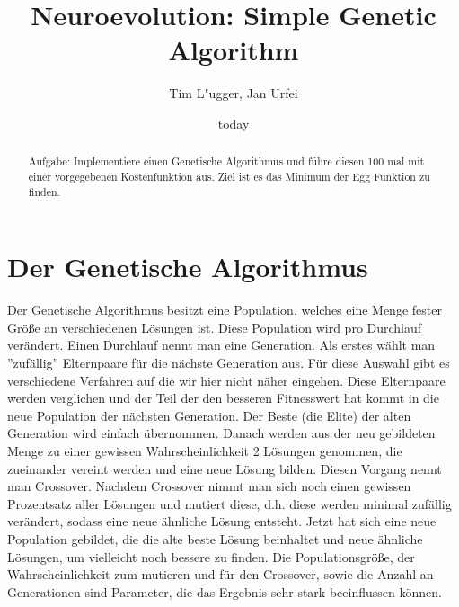\documentclass{hbrs-ecta-report}
\begin{document}

\title{Neuroevolution: Simple Genetic Algorithm}
\subtitle{}

\author{
\alignauthor
Tim L"ugger, Jan Urfei
}

\date{today}
\maketitle
\begin{abstract}
Aufgabe: Implementiere einen Genetische Algorithmus und führe diesen 100 mal mit einer vorgegebenen Kostenfunktion aus. Ziel ist es das Minimum der Egg Funktion zu finden.
\end{abstract}

\section{Der Genetische Algorithmus}
Der Genetische Algorithmus besitzt eine Population, welches eine Menge fester Größe an verschiedenen Lösungen ist. Diese Population wird pro Durchlauf verändert. Einen Durchlauf nennt man eine Generation. 
\newline \newline
Als erstes wählt man ''zufällig'' Elternpaare für die nächste Generation aus. Für diese Auswahl gibt es verschiedene Verfahren auf die wir hier nicht näher eingehen. Diese Elternpaare werden verglichen und der Teil der den besseren Fitnesswert hat kommt in die neue Population der nächsten Generation. Der Beste (die Elite) der alten Generation wird einfach übernommen.
\newline \newline
Danach werden aus der neu gebildeten Menge zu einer gewissen Wahrscheinlichkeit  2 Lösungen genommen, die zueinander vereint werden und eine neue Lösung bilden. Diesen Vorgang nennt man Crossover.
\newline \newline
Nachdem Crossover nimmt man sich noch einen gewissen Prozentsatz aller Lösungen und mutiert diese, d.h. diese werden minimal zufällig verändert, sodass eine neue ähnliche Lösung entsteht.
\newline \newline
Jetzt  hat sich eine neue Population gebildet, die die alte beste Lösung beinhaltet und neue ähnliche Lösungen, um vielleicht noch bessere zu finden. Die Populationsgröße, der Wahrscheinlichkeit zum mutieren und für den Crossover, sowie die Anzahl an Generationen sind Parameter, die das Ergebnis sehr stark beeinflussen können.
\end{document}

